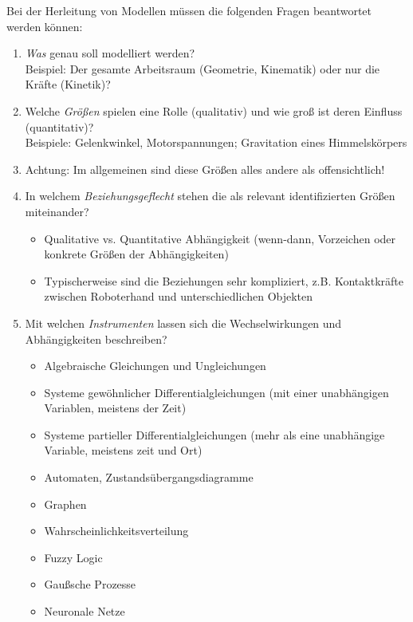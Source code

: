             Bei der Herleitung von Modellen müssen die folgenden Fragen beantwortet werden können:
            \begin{enumerate}
            	\item \textit{Was} genau soll modelliert werden? \\ Beispiel: Der gesamte Arbeitsraum (Geometrie, Kinematik) oder nur die Kräfte (Kinetik)?
            	\item Welche \textit{Größen} spielen eine Rolle (qualitativ) und wie groß ist deren Einfluss (quantitativ)? \\ Beispiele: Gelenkwinkel, Motorspannungen; Gravitation eines Himmelskörpers
            	\item[] Achtung: Im allgemeinen sind diese Größen alles andere als offensichtlich!
            	\item In welchem \textit{Beziehungsgeflecht} stehen die als relevant identifizierten Größen miteinander?
                	\begin{itemize}
                		\item Qualitative vs. Quantitative Abhängigkeit (wenn-dann, Vorzeichen oder konkrete Größen der Abhängigkeiten)
                		\item Typischerweise sind die Beziehungen sehr kompliziert, z.B. Kontaktkräfte zwischen Roboterhand und unterschiedlichen Objekten
                	\end{itemize}
            	\item Mit welchen \textit{Instrumenten} lassen sich die Wechselwirkungen und Abhängigkeiten beschreiben?
                	\begin{itemize}
                		\item Algebraische Gleichungen und Ungleichungen
                		\item Systeme gewöhnlicher Differentialgleichungen (mit einer unabhängigen Variablen, meistens der Zeit)
                		\item Systeme partieller Differentialgleichungen (mehr als eine unabhängige Variable, meistens zeit und Ort)
                		\item Automaten, Zustandsübergangsdiagramme
                		\item Graphen
                		\item Wahrscheinlichkeitsverteilung
                		\item Fuzzy Logic
                		\item Gaußsche Prozesse
                		\item Neuronale Netze

\end{itemize}
\end{enumerate}
